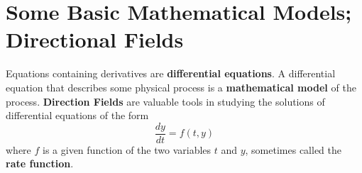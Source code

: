 \section{Some Basic Mathematical Models; Directional Fields}
    Equations containing derivatives are \textbf{differential equations}. 
    \newline
    A differential equation that describes some physical process is a \textbf{mathematical model} of the process.
    \newline
    \textbf{Direction Fields} are valuable tools in studying the solutions of differential equations of the form
    \begin{equation*}
        \frac{dy}{dt} = f(t, y)
    \end{equation*}
    where $f$ is a given function of the two variables $t$ and $y$, sometimes called the \textbf{rate function}.